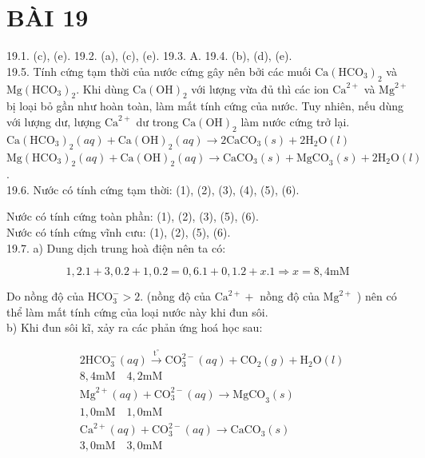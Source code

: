 \documentclass[10pt]{article}
\begin{document}
\section*{BÀI 19}
19.1. (c), (e). 19.2. (a), (c), (e). 19.3. A. 19.4. (b), (d), (e).\\
19.5. Tính cứng tạm thời của nước cứng gây nên bởi các muối $\mathrm{Ca}\left(\mathrm{HCO}_{3}\right)_{2}$ và $\mathrm{Mg}\left(\mathrm{HCO}_{3}\right)_{2}$. Khi dùng $\mathrm{Ca}(\mathrm{OH})_{2}$ với lượng vừa đủ thì các ion $\mathrm{Ca}^{2+}$ và $\mathrm{Mg}^{2+}$ bị loại bỏ gần như hoàn toàn, làm mất tính cứng của nước. Tuy nhiên, nếu dùng với lượng dư, lượng $\mathrm{Ca}^{2+}$ dư trong $\mathrm{Ca}(\mathrm{OH})_{2}$ làm nước cứng trở lại.\\
$\mathrm{Ca}\left(\mathrm{HCO}_{3}\right)_{2}(a q)+\mathrm{Ca}(\mathrm{OH})_{2}(a q) \rightarrow 2 \mathrm{CaCO}_{3}(s)+2 \mathrm{H}_{2} \mathrm{O}(l)$\\
$\mathrm{Mg}\left(\mathrm{HCO}_{3}\right)_{2}(a q)+\mathrm{Ca}(\mathrm{OH})_{2}(a q) \rightarrow \mathrm{CaCO}_{3}(s)+\mathrm{MgCO}_{3}(s)+2 \mathrm{H}_{2} \mathrm{O}(l)$.\\
19.6. Nước có tính cứng tạm thời: (1), (2), (3), (4), (5), (6).

Nước có tính cứng toàn phần: (1), (2), (3), (5), (6).\\
Nước có tính cứng vĩnh cưu: (1), (2), (5), (6).\\
19.7. a) Dung dịch trung hoà điện nên ta có:

$$
1,2.1+3,0.2+1,0.2=0,6.1+0,1.2+x .1 \Rightarrow x=8,4 \mathrm{mM}
$$

Do nồng độ của $\mathrm{HCO}_{3}^{-}>2$. (nồng độ của $\mathrm{Ca}^{2+}+$ nồng độ của $\mathrm{Mg}^{2+}$ ) nên có thể làm mất tính cứng của loại nước này khi đun sôi.\\
b) Khi đun sôi kĩ, xảy ra các phản ứng hoá học sau:

$$
\begin{aligned}
& 2 \mathrm{HCO}_{3}^{-}(a q) \xrightarrow{\mathrm{t}^{\circ}} \mathrm{CO}_{3}^{2-}(a q)+\mathrm{CO}_{2}(g)+\mathrm{H}_{2} \mathrm{O}(l) \\
& 8,4 \mathrm{mM} \quad 4,2 \mathrm{mM} \\
& \mathrm{Mg}^{2+}(a q)+\mathrm{CO}_{3}^{2-}(a q) \longrightarrow \mathrm{MgCO}_{3}(s) \\
& 1,0 \mathrm{mM} \quad 1,0 \mathrm{mM} \\
& \mathrm{Ca}^{2+}(a q)+\mathrm{CO}_{3}^{2-}(a q) \longrightarrow \mathrm{CaCO}_{3}(s) \\
& 3,0 \mathrm{mM} \quad 3,0 \mathrm{mM}
\end{aligned}
$$
\end{document}
